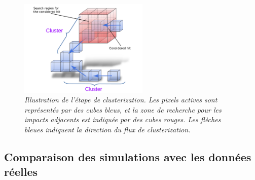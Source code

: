 \begin{figure}
	\centering
	\includegraphics[width=0.55\textwidth]{ECAL/graphics/demo-v3.pdf}
	\caption{\label{fig:democlusterF} \sl Illustration de l'étape de clusterization. Les pixels actives sont représentés par des cubes bleus, et la zone de recherche pour les impacts adjacents est indiquée par des cubes rouges. Les flèches bleues indiquent la direction du flux de clusterization.}
\end{figure}


\subsection*{Comparaison des simulations avec les données réelles}



